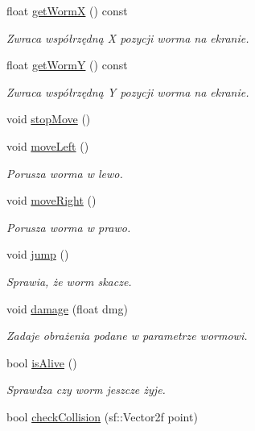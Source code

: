 \begin{DoxyCompactItemize}
float \mbox{\hyperlink{class_worm_a9787181c41ca3a4ac5098277e8a4a142}{get\+WormX}} () const
\begin{DoxyCompactList}\small\item\em Zwraca współrzędną X pozycji worma na ekranie. \end{DoxyCompactList}\item 
float \mbox{\hyperlink{class_worm_aa1a5e5334f8d3e339f15b36a9af31f27}{get\+WormY}} () const
\begin{DoxyCompactList}\small\item\em Zwraca współrzędną Y pozycji worma na ekranie. \end{DoxyCompactList}\item 
void \mbox{\hyperlink{class_worm_a1cdb0c544127417ba4b95fd8e5d3f9fc}{stop\+Move}} ()
\item 
void \mbox{\hyperlink{class_worm_a93d02457a10bbbfc1d2028168419ecb8}{move\+Left}} ()
\begin{DoxyCompactList}\small\item\em Porusza worma w lewo. \end{DoxyCompactList}\item 
void \mbox{\hyperlink{class_worm_a6d4b33910c18b0e266e310d9b5512d75}{move\+Right}} ()
\begin{DoxyCompactList}\small\item\em Porusza worma w prawo. \end{DoxyCompactList}\item 
void \mbox{\hyperlink{class_worm_ae4cd763e0edd18cecab42b39142cea14}{jump}} ()
\begin{DoxyCompactList}\small\item\em Sprawia, że worm skacze. \end{DoxyCompactList}\item 
void \mbox{\hyperlink{class_worm_aa57fe22ce4031e5332d16d709e7274c8}{damage}} (float dmg)
\begin{DoxyCompactList}\small\item\em Zadaje obrażenia podane w parametrze wormowi. \end{DoxyCompactList}\item 
bool \mbox{\hyperlink{class_worm_a606868b7856598eef50b8ebcd2374927}{is\+Alive}} ()
\begin{DoxyCompactList}\small\item\em Sprawdza czy worm jeszcze żyje. \end{DoxyCompactList}\item 
bool \mbox{\hyperlink{class_worm_a61589ff1104deb3cbf1cb6978e7f95f4}{check\+Collision}} (sf\+::\+Vector2f point)

\end{DoxyCompactItemize}
